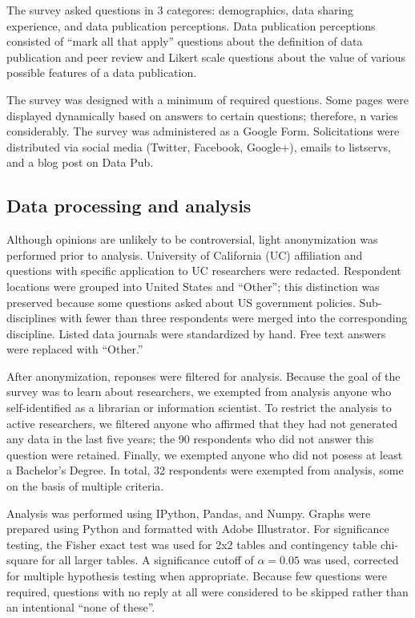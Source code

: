 \documentclass[10pt]{article}
\begin{document}
The survey asked questions in 3 categores: demographics, data sharing experience, and data publication perceptions.
Data publication perceptions consisted of ``mark all that apply'' questions about the definition of data publication and peer review and Likert scale questions about the value of various possible features of a data publication.

The survey was designed with a minimum of required questions.
Some pages were displayed dynamically based on answers to certain questions; therefore, n varies considerably.
The survey was administered as a Google Form.
Solicitations were distributed via social media (Twitter, Facebook, Google+), emails to listservs, and a blog post on Data Pub\cite{kratz_data_2014}.

\subsection*{Data processing and analysis}
Although opinions are unlikely to be controversial, light anonymization was performed prior to analysis.
University of California (UC) affiliation and questions with specific application to UC researchers were redacted.
Respondent locations were grouped into United States and ``Other''; this distinction was preserved because some questions asked about US government policies.  
Sub-disciplines with fewer than three respondents were merged into the corresponding discipline.
Listed data journals were standardized by hand.
Free text answers were replaced with ``Other.''

After anonymization, reponses were filtered for analysis.
Because the goal of the survey was to learn about researchers, we exempted from analysis anyone who self-identified as a librarian or information scientist.
To restrict the analysis to active researchers, we filtered anyone who affirmed that they had not generated any data in the last five years; the 90 respondents who did not answer this question were retained.
Finally, we exempted anyone who did not posess at least a Bachelor's Degree.
In total, 32 respondents were exempted from analysis, some on the basis of multiple criteria.

Analysis was performed using IPython\cite{perez_ipython_2007}, Pandas\cite{mckinney-proc-scipy-2010}, and Numpy\cite{van_der_walt_numpy_2011}.
Graphs were prepared using Python and formatted with Adobe Illustrator.
For significance testing, the Fisher exact test was used for 2x2 tables and contingency table chi-square for all larger tables.
A significance cutoff of $\alpha=0.05$ was used, corrected for multiple hypothesis testing when appropriate.
Because few questions were required, questions with no reply at all were considered to be skipped rather than an intentional ``none of these''.
\end{document}
